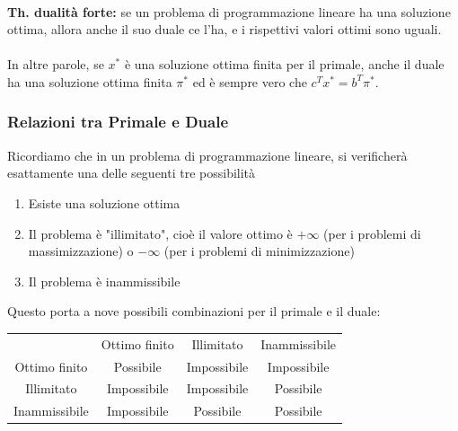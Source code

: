 \documentclass[a4paper, 11pt]{article}
\begin{document}
        \paragraph{}
        \textbf{Th. dualità forte:} se un problema di programmazione lineare ha una soluzione ottima, allora anche il suo duale ce l'ha, e i rispettivi valori ottimi sono uguali.
        
        \paragraph{}
        In altre parole, se $x^*$ è una soluzione ottima finita per il primale, anche il duale ha una soluzione ottima finita $\pi^*$ ed è sempre vero che $c^T x^* = b^T \pi^*$.
        
        \subsubsection*{Relazioni tra Primale e Duale}
        Ricordiamo che in un problema di programmazione lineare, si verificherà esattamente una delle seguenti tre possibilità
        \begin{enumerate}
            \item Esiste una soluzione ottima
            \item Il problema è "illimitato", cioè il valore ottimo è $+\infty$ (per i problemi di massimizzazione) o $-\infty$ (per i problemi di minimizzazione)
            \item Il problema è inammissibile
        \end{enumerate}

        Questo porta a nove possibili combinazioni per il primale e il duale:

        \begin{table}[ht]
            \centering
            \begin{tabular}{c|c|c|c}
                & Ottimo finito & Illimitato & Inammissibile \\
                Ottimo finito & Possibile & Impossibile & Impossibile \\
                Illimitato & Impossibile & Impossibile & Possibile \\
                Inammissibile & Impossibile & Possibile & Possibile \\
            \end{tabular}
        \end{table}
\end{document}
